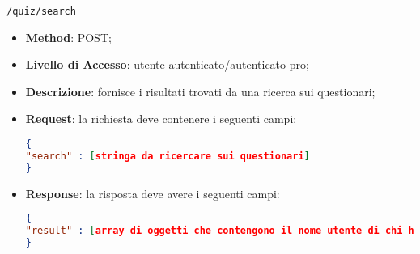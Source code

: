 	\item \texttt{/quiz/search}
		\begin{itemize}
			\item \textbf{Method}: POST;
			\item \textbf{Livello di Accesso}: utente autenticato/autenticato pro;
			\item \textbf{Descrizione}: fornisce i risultati trovati da una ricerca sui questionari;
			\item \textbf{Request}: la richiesta deve contenere i seguenti campi:
\begin{lstlisting}[language=json,firstnumber=1]
{
"search" : [stringa da ricercare sui questionari]
}
\end{lstlisting}
			\item \textbf{Response}: la risposta deve avere i seguenti campi:
\begin{lstlisting}[language=json,firstnumber=1]
{
"result" : [array di oggetti che contengono il nome utente di chi ha creato il questionario, il nome del questionarioe il suo identificativo]
}
\end{lstlisting} 
		\end{itemize}